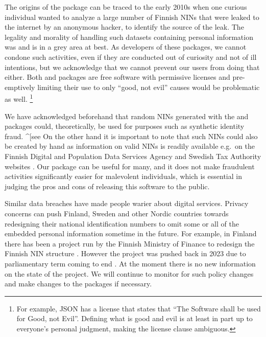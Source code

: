 The origins of the  package can be traced to the early 2010s when one curious individual wanted to analyze a large number of Finnish NINs that were leaked to the internet by an anonymous hacker, to identify the source of the leak. The legality and morality of handling such datasets containing personal information was and is in a grey area at best. As developers of these packages, we cannot condone such activities, even if they are conducted out of curiosity and not of ill intentions, but we acknowledge that we cannot prevent our users from doing that either. Both  and  packages are free software with permissive licenses and pre-emptively limiting their use to only ``good, not evil'' causes would be problematic as well. \footnote{For example, JSON has a license that states that ``The Software shall be used for Good, not Evil''. Defining what is good and evil is at least in part up to everyone's personal judgment, making the license clause ambiguous.}

We have acknowledged beforehand that random NINs generated with the  and  packages could, theoretically, be used for purposes such as synthetic identity fraud. \^{}{[}see \citep[p.~32 for a short description of synthetic fraud related to American SSNs]{brensinger2021} On the other hand it is important to note that such NINs could also be created by hand as information on valid NINs is readily available e.g.~on the Finnish Digital and Population Data Services Agency and Swedish Tax Authority websites \citep{hetudvv, sv2007}. Our package can be useful for many, and it does not make fraudulent activities significantly easier for malevolent individuals, which is essential in judging the pros and cons of releasing this software to the public.

Similar data breaches have made people warier about digital services. Privacy concerns can push Finland, Sweden and other Nordic countries towards redesigning their national identification numbers to omit some or all of the embedded personal information sometime in the future. For example, in Finland there has been a project run by the Finnish Ministry of Finance to redesign the Finnish NIN structure \citep{valtiovarainministerio2022}. However the project was pushed back in 2023 due to parliamentary term coming to end \citep{hetupostponed}. At the moment there is no new information on the state of the project. We will continue to monitor for such policy changes and make changes to the packages if necessary.

